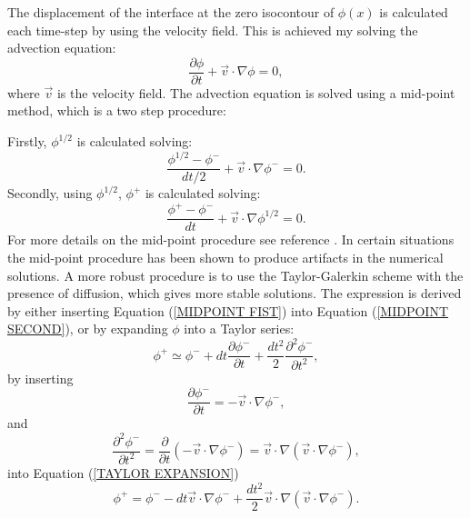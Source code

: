 The displacement of the interface at the zero isocontour of $\phi(x)$ is calculated each time-step by using the velocity field. This is achieved my solving the advection equation:
%
\begin{equation}
\frac{\partial \phi}{\partial t} + \vec{v} \cdot \nabla \phi = 0,
\label{ADVECTION}
\end{equation}
%
where $\vec{v}$ is the velocity field. The advection equation is solved using a mid-point method, which is a two step procedure:

Firstly, $\phi^{1/2}$ is calculated solving:
%
\begin{equation}
\frac{\phi^{1/2} - \phi^{-}}{dt/2} + \vec{v} \cdot \nabla \phi^{-} = 0.
\label{MIDPOINT FIST}
\end{equation}
%
Secondly, using $\phi^{1/2}$, $\phi^{+}$ is calculated solving:
%
\begin{equation}
\frac{\phi^{+} - \phi^{-}}{dt} + \vec{v} \cdot \nabla \phi^{1/2} = 0.
\label{MIDPOINT SECOND}
\end{equation}
%
For more details on the mid-point procedure see reference \cite{BOURGOUIN2006}. In certain situations the mid-point procedure has been shown to produce artifacts in the numerical solutions. A more robust procedure is to use the Taylor-Galerkin scheme with the presence of diffusion, which gives more stable solutions. The expression is derived by either inserting Equation (\ref{MIDPOINT FIST}) into Equation (\ref{MIDPOINT SECOND}), or by expanding $\phi$ into a Taylor series:
%
\begin{equation}
\phi^{+} \simeq \phi^{-} + dt\frac{\partial \phi^{-}}{\partial t} + \frac{dt^2}{2}\frac{\partial^{2}\phi^{-}}{\partial t^{2}},
\label{TAYLOR EXPANSION}
\end{equation}
%
by inserting
%
\begin{equation}
\frac{\partial \phi^{-}}{\partial t} = - \vec{v} \cdot \nabla \phi^{-},
\label{INSERT ADVECTION}
\end{equation}
%
and
%
\begin{equation}
\frac{\partial^{2} \phi^{-}}{\partial t^{2}} = \frac{\partial}{\partial t}(-\vec{v} \cdot \nabla \phi^{-}) = \vec{v}\cdot \nabla (\vec{v}\cdot \nabla \phi^{-}),
\label{SECOND ORDER}
\end{equation}
%
into Equation (\ref{TAYLOR EXPANSION})
%
\begin{equation}
\phi^{+} = \phi^{-} - dt\vec{v}\cdot \nabla \phi^{-} + \frac{dt^2}{2}\vec{v}\cdot \nabla (\vec{v}\cdot \nabla \phi^{-}).
\label{TAYLOR GALERKIN}
\end{equation}


